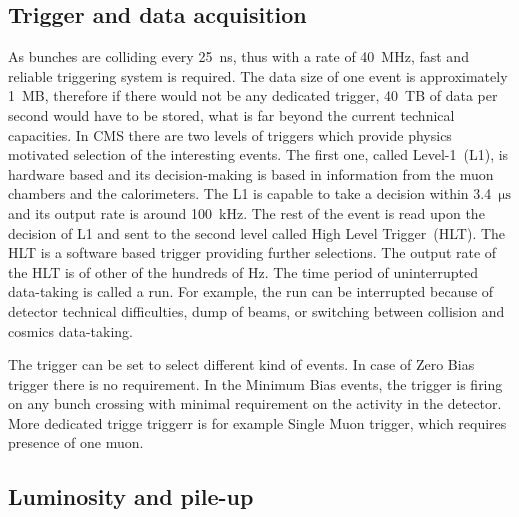 
\subsection{Trigger and data acquisition}

As bunches are colliding every 25~ns, thus with a rate of 40~MHz, fast and reliable triggering system is required. The data size of one event is approximately 1~MB, therefore if there would not be any dedicated trigger, 40~TB of data per second would have to be stored, what is far beyond the current technical capacities. In CMS there are two levels of triggers which provide physics motivated selection of the interesting events. The first one, called Level-1~(L1), is hardware based and its decision-making is based in information from the muon chambers and the calorimeters. The L1 is capable to take a decision within 3.4~$\mathrm{\mu s}$ and its output rate is around 100~kHz. The rest of the event is read upon the decision of L1 and sent to the second level called High Level Trigger~(HLT). The HLT is a software based trigger providing further selections. The output rate of the HLT is of other of the hundreds of Hz. The time period of uninterrupted data-taking is called a run. For example, the run can be interrupted because of detector technical difficulties, dump of beams, or switching between collision and cosmics data-taking.

The trigger can be set to select different kind of events. In case of Zero Bias trigger there is no requirement. In the Minimum Bias events, the trigger is firing on any bunch crossing with minimal requirement on the activity in the detector. More dedicated trigge triggerr is for example Single Muon trigger, which requires presence of one muon. 

\subsection{Luminosity and pile-up}

